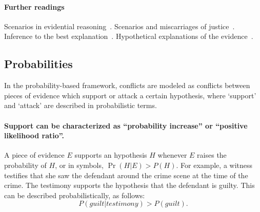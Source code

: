 \documentclass[10pt]{article}
\begin{document}
\paragraph{Further readings} 
Scenarios in evidential reasoning~\citep{bennettFeldman1981,penningtonHastie1993,penningtonHastie1993StoryModel}. Scenarios and miscarriages of justice~\citep{wagenaarEtal1993}. Inference to the best explanation~\citep{pardoAllen2008}. Hypothetical explanations of the evidence~\citep{thagard1989}. 

\subsection{Probabilities}

In the probability-based framework, conflicts are modeled as conflicts between pieces 
of evidence which support or attack a certain hypothesis, where `support' 
and `attack' are described in probabilistic terms. 

\paragraph{Support can be characterized as ``probability increase'' or ``positive likelihood ratio''.} 
A piece of evidence $E$ supports an 
hypothesis $H$ whenever $E$ raises the probability of $H$, or in symbols, 
$\Pr(H|E) > P(H)$. 
For example, a witness 
testifies that she saw the defendant around the crime scene
 at the time of the crime. The testimony supports the hypothesis 
 that the defendant is guilty. 
This can be described probabilistically, as follows:
 \[ P(\textit{guilt}|\textit{testimony}) > P(\textit{guilt}).\] 
\end{document}
